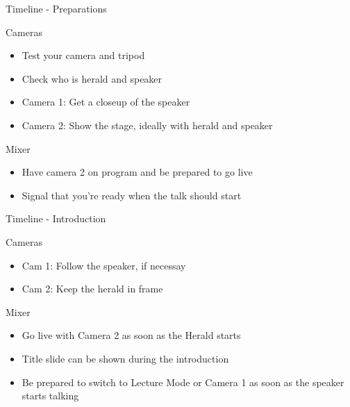 
\begin{frame}{Timeline - Preparations}
	\begin{block}{Cameras}
		\begin{itemize}
			\item Test your camera and tripod
			\item Check who is herald and speaker
			\item Camera 1: Get a closeup of the speaker
			\item Camera 2: Show the stage, ideally with herald and speaker
		\end{itemize}
	\end{block}
	\begin{block}{Mixer}
		\begin{itemize}
			\item Have camera 2 on program and be prepared to go live
			\item Signal that you're ready when the talk should start
		\end{itemize}
	\end{block}
\end{frame}

\begin{frame}{Timeline - Introduction}
	\begin{block}{Cameras}
		\begin{itemize}
			\item Cam 1: Follow the speaker, if necessay
			\item Cam 2: Keep the herald in frame
		\end{itemize}
	\end{block}
	\begin{block}{Mixer}
		\begin{itemize}
			\item Go live with Camera 2 as soon as the Herald starts
			\item Title slide can be shown during the introduction 
			\item Be prepared to switch to Lecture Mode or Camera 1 as soon as the speaker starts talking
		\end{itemize}
	\end{block}
\end{frame}

